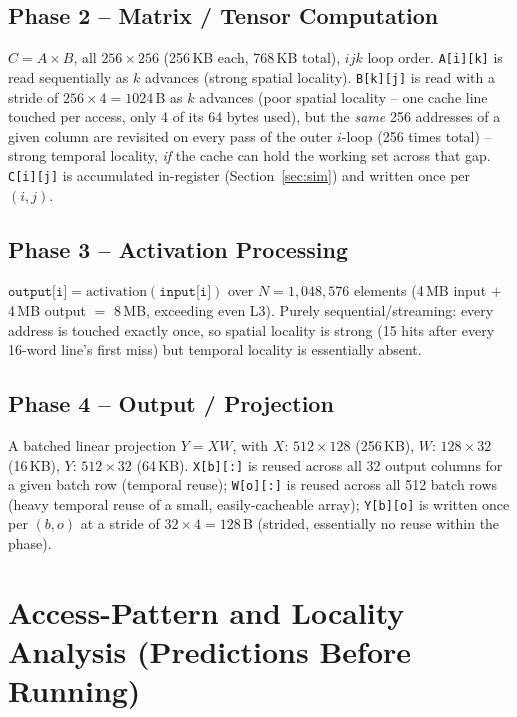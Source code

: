 \documentclass[11pt]{article}
\begin{document}
\subsection{Phase 2 -- Matrix / Tensor Computation}
$C = A \times B$, all $256\times256$ (256\,KB each, 768\,KB total), $ijk$
loop order. \texttt{A[i][k]} is read sequentially as $k$ advances (strong
spatial locality). \texttt{B[k][j]} is read with a stride of
$256\times4=1024$\,B as $k$ advances (poor spatial locality -- one cache
line touched per access, only 4 of its 64 bytes used), but the
\emph{same} 256 addresses of a given column are revisited on every pass of
the outer $i$-loop (256 times total) -- strong temporal locality,
\emph{if} the cache can hold the working set across that gap.
\texttt{C[i][j]} is accumulated in-register (Section~\ref{sec:sim}) and
written once per $(i,j)$.

\subsection{Phase 3 -- Activation Processing}
$\texttt{output[i]} = \text{activation}(\texttt{input[i]})$ over
$N=1{,}048{,}576$ elements (4\,MB input $+$ 4\,MB output $=$ 8\,MB,
exceeding even L3). Purely sequential/streaming: every address is touched
exactly once, so spatial locality is strong (15 hits after every 16-word
line's first miss) but temporal locality is essentially absent.

\subsection{Phase 4 -- Output / Projection}
A batched linear projection $Y = X W$, with $X$: $512\times128$ (256\,KB),
$W$: $128\times32$ (16\,KB), $Y$: $512\times32$ (64\,KB). \texttt{X[b][:]}
is reused across all 32 output columns for a given batch row (temporal
reuse); \texttt{W[o][:]} is reused across all 512 batch rows (heavy
temporal reuse of a small, easily-cacheable array); \texttt{Y[b][o]} is
written once per $(b,o)$ at a stride of $32\times4=128$\,B (strided,
essentially no reuse within the phase).

\section{Access-Pattern and Locality Analysis (Predictions Before Running)}
\end{document}
